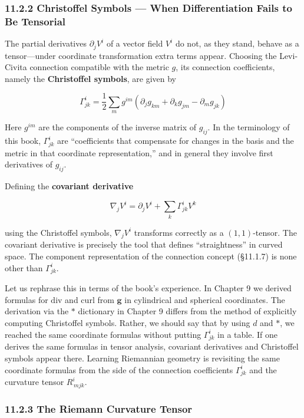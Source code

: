 \hypertarget{christoffel-symbols-when-differentiation-fails-to-be-tensorial}{%
\subsubsection{11.2.2 Christoffel Symbols --- When Differentiation Fails
to Be
Tensorial}\label{christoffel-symbols-when-differentiation-fails-to-be-tensorial}}

The partial derivatives \(\partial_j V^i\) of a vector field \(V^i\) do
not, as they stand, behave as a tensor---under coordinate transformation
extra terms appear. Choosing the Levi-Civita connection compatible with
the metric \(g\), its connection coefficients, namely the
\textbf{Christoffel symbols}, are given by

\[\Gamma^i_{jk} = \frac{1}{2}\sum_m g^{im}(\partial_j g_{km} + \partial_k g_{jm} - \partial_m g_{jk})\]

Here \(g^{im}\) are the components of the inverse matrix of \(g_{ij}\).
In the terminology of this book, \(\Gamma^i_{jk}\) are ``coefficients
that compensate for changes in the basis and the metric in that
coordinate representation,'' and in general they involve first
derivatives of \(g_{ij}\).

Defining the \textbf{covariant derivative}

\[\nabla_j V^i = \partial_j V^i + \sum_k \Gamma^i_{jk} V^k\]

using the Christoffel symbols, \(\nabla_j V^i\) transforms correctly as
a \((1,1)\)-tensor. The covariant derivative is precisely the tool that
defines ``straightness'' in curved space. The component representation
of the connection concept (§11.1.7) is none other than
\(\Gamma^i_{jk}\).

Let us rephrase this in terms of the book's experience. In Chapter 9 we
derived formulas for \(\mathrm{div}\) and \(\mathrm{curl}\) from
\(\mathbf{g}\) in cylindrical and spherical coordinates. The derivation
via the \(\ast\) dictionary in Chapter 9 differs from the method of
explicitly computing Christoffel symbols. Rather, we should say that by
using \(d\) and \(\ast\), we reached the same coordinate formulas
without putting \(\Gamma^i_{jk}\) in a table. If one derives the same
formulas in tensor analysis, covariant derivatives and Christoffel
symbols appear there. Learning Riemannian geometry is revisiting the
same coordinate formulas from the side of the connection coefficients
\(\Gamma^i_{jk}\) and the curvature tensor \(R^i_{\,mjk}\).

\hypertarget{the-riemann-curvature-tensor}{%
\subsubsection{11.2.3 The Riemann Curvature
Tensor}\label{the-riemann-curvature-tensor}}

